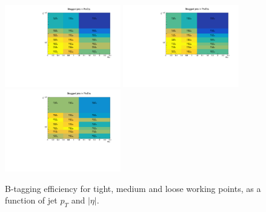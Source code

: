 \begin{figure}[h]
  \centering
  \includegraphics[width=0.45\textwidth]{figures/sec-jets/btageff_tight.pdf}\hfil
  \includegraphics[width=0.45\textwidth]{figures/sec-jets/btageff_medium.pdf}\hfil
  \includegraphics[width=0.45\textwidth]{figures/sec-jets/btageff_loose.pdf}\hfil 
  \caption{B-tagging efficiency for tight, medium and loose working points, as a function of jet $p_{T}$ and $|\eta|$.}
  \label{fig:btageff}
\end{figure}

